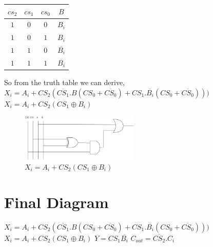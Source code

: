 \documentclass[12pt]{extarticle}
\begin{document}
	\begin{center}
		\begin{tabular}{|c|c|c|c|}
			\hline
			$cs_2$ & $cs_1$ & $cs_0$ & $B$ \\
			\hline
			
			\hline
			$1$ & $0$ & $0$ & $B_i$ \\
			\hline
			
			\hline
			$1$ & $0$ & $1$ & $B_i$ \\
			\hline
			
			\hline
			$1$ & $1$ & $0$ & $\overline{B_i}$ \\
			\hline
			
			\hline
			$1$ & $1$ & $1$ & $\overline{B_i}$ \\
			\hline
		\end{tabular}
	\end{center}
	So from the truth table we can derive, \newline
	$X_i=A_i+CS_2(\overline{CS_1}.B(CS_0 + \overline{CS_0})+CS_1.\overline{B_i}(CS_0 + \overline{CS_0})) )$ \newline
	$X_i=A_i+CS_2(CS_1\oplus B_i)$ \newline
	
	\begin{figure}[h]
		\centering
		\includegraphics[width = 0.5\textwidth]{image/ckt2.png}
		\caption{
			$X_i=A_i+CS_2(CS_1\oplus B_i)$ \newline
		}
		\label{fig:ckt1}
		
	\end{figure}
	
	\section{Final Diagram}
	$X_i=A_i+CS_2(\overline{CS_1}.B(CS_0 + \overline{CS_0})+CS_1.\overline{B_i}(CS_0 + \overline{CS_0})) )$ \newline
	$X_i=A_i+CS_2(CS_1\oplus B_i)$ \newline
	$Y=CS_1\overline{B_i}$\newline
	$C_{out}=\overline{CS_2}.C_i$ 
	
	
\end{document}
